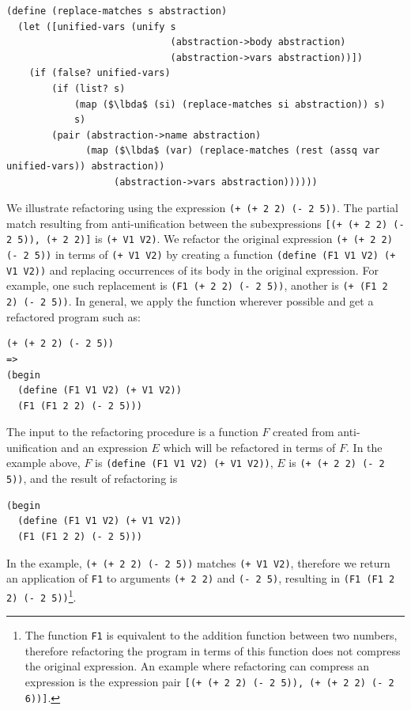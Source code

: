 \documentclass[a4paper,10pt]{article}
\newcommand{\lbda}{\color[rgb]{0,.3,.7} \lambda}
\begin{document}
\begin{lstlisting}[frame=trbl]
(define (replace-matches s abstraction)
  (let ([unified-vars (unify s
                             (abstraction->body abstraction)
                             (abstraction->vars abstraction))])
    (if (false? unified-vars)
        (if (list? s)
            (map ($\lbda$ (si) (replace-matches si abstraction)) s)
            s)
        (pair (abstraction->name abstraction)
              (map ($\lbda$ (var) (replace-matches (rest (assq var unified-vars)) abstraction))
                   (abstraction->vars abstraction))))))
\end{lstlisting}
We illustrate refactoring using the expression \texttt{(+ (+ 2 2) (- 2 5))}. The partial match resulting from anti-unification between the subexpressions \texttt{[(+ (+ 2 2) (- 2 5)), (+ 2 2)]} is \texttt{(+ V1 V2)}.  We refactor the original expression \texttt{(+ (+ 2 2) (- 2 5))} in terms of \texttt{(+ V1 V2)} by creating a function \texttt{(define (F1 V1 V2) (+ V1 V2))} and replacing occurrences of its body in the original expression.  For example, one such replacement is \texttt{(F1 (+ 2 2) (- 2 5))}, another is \texttt{(+ (F1 2 2) (- 2 5))}.  In general, we apply the function wherever possible and get a refactored program such as:
\begin{lstlisting}
(+ (+ 2 2) (- 2 5))
=>
(begin
  (define (F1 V1 V2) (+ V1 V2))
  (F1 (F1 2 2) (- 2 5)))
\end{lstlisting}
The input to the refactoring procedure is a function $F$ created from anti-unification and an expression $E$ which will be refactored in terms of $F$.  In the example above, $F$ is \texttt{(define (F1 V1 V2) (+ V1 V2))}, $E$ is \texttt{(+ (+ 2 2) (- 2 5))}, and the result of refactoring is
\begin{lstlisting}
(begin
  (define (F1 V1 V2) (+ V1 V2))
  (F1 (F1 2 2) (- 2 5)))
\end{lstlisting}

In the example, \texttt{(+ (+ 2 2) (- 2 5))} matches \texttt{(+ V1 V2)}, therefore we return an application of \texttt{F1} to arguments \texttt{(+ 2 2)} and \texttt{(- 2 5)}, resulting in \texttt{(F1 (F1 2 2) (- 2 5))}\footnote{The function \texttt{F1} is equivalent to the addition function between two numbers, therefore refactoring the program in terms of this function does not compress the original expression.  An example where refactoring can compress an expression is the expression pair \texttt{[(+ (+ 2 2) (- 2 5)), (+ (+ 2 2) (- 2 6))]}.}.
\end{document}
